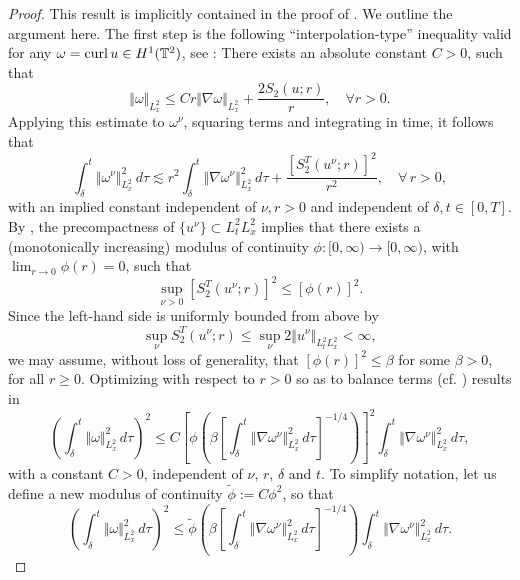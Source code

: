 \documentclass[reqno,12pt]{amsart}
\renewcommand{\tilde}{\widetilde}
\DeclareMathOperator{\curl}{curl}
\begin{document}
\begin{proof}
  This result is implicitly contained in the proof of \cite[Thm. 2.11]{LMPP2021a}. We outline the argument here. The first step is the following ``interpolation-type'' inequality valid for any $\omega = \curl u \in H^1 (\T^2)$, see \cite[Lemma 2.6]{LMPP2021a}: There exists an absolute constant $C>0$, such that
  \[
  \Vert \omega \Vert_{L^2_x} \le C r \Vert \nabla \omega \Vert_{L^2_x} + \frac{2S_2(u;r)}{r}, \quad \forall r>0.
  \]
  Applying this estimate to $\omega^\nu$, squaring terms and integrating in time, it follows that
  \[
  \int_\delta^t \Vert \omega^\nu \Vert_{L^2_x}^2 \, d\tau
  \lesssim
  r^2 \int_\delta^t \Vert \nabla \omega^\nu \Vert_{L^2_x}^2 \, d\tau
  +
  \frac{[S_2^T(u^\nu;r)]^2}{r^2}, \quad \forall \, r>0,
  \]
  with an implied constant independent of $\nu,r>0$ and independent of $\delta,t \in [0,T]$. By \cite[Prop. 2.10]{LMPP2021a}, the precompactness of $\{u^\nu\}\subset L^2_tL^2_x$ implies that there exists a (monotonically increasing) modulus of continuity $\phi: [0,\infty) \to [0,\infty)$, with $\lim_{r\to 0} \phi(r) = 0$, such that
      \[
      \sup_{\nu > 0} [S^T_2(u^\nu;r)]^2 \le [\phi(r)]^2.
      \]
      Since the left-hand side is uniformly bounded from above by
      \[\sup_\nu S^T_2(u^\nu;r) \le \sup_\nu 2\Vert u^\nu \Vert_{L^2_tL^2_x} <\infty,\]
      we may assume, without loss of generality, that $[\phi(r)]^2 \le \beta$ for some $\beta >0$, for all $r \ge 0$. Optimizing with respect to $r > 0$  so as to balance terms (cf. \cite[eq. (2.13)]{LMPP2021a})  results in
  \[
  \left(\int_\delta^t \Vert \omega \Vert_{L^2_x}^2 \, d\tau\right)^2
  \le C \left[
  \phi\left(\beta\left[\textstyle\int_\delta^t \Vert \nabla \omega^\nu \Vert_{L^2_x}^2 \, d\tau \right]^{-1/4}\right)\right]^2 \int_\delta^t \Vert \nabla \omega^\nu \Vert_{L^2_x}^2 \, d\tau,
  \]
  with a constant $C>0$, independent of $\nu$, $r$, $\delta$ and $t$.
 To simplify notation, let us define a new modulus of continuity $\tilde{\phi} := C \phi^2$, so that
  \begin{equation}\label{tildephi}
  \left(\int_\delta^t \Vert \omega \Vert_{L^2_x}^2 \, d\tau\right)^2
  \le
  \tilde{\phi}\left(\beta\left[\textstyle\int_\delta^t \Vert \nabla \omega^\nu \Vert_{L^2_x}^2 \, d\tau \right]^{-1/4}\right) \int_\delta^t \Vert \nabla \omega^\nu \Vert_{L^2_x}^2 \, d\tau.
    \end{equation}


\end{proof}
\end{document}
